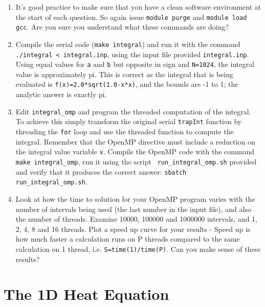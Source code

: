 \documentclass[a4paper, 12pt]{article}
\def \cc   {\tt }               %
\begin{document}
\begin{enumerate}

  \item It's good practice to make sure that you have a clean
    software environment at the start of each question. So
    again issue {\cc module purge} and
    {\cc module load gcc}. Are you sure you
    understand what these commands are doing?

  \item Compile the serial code ({\cc make integral}) and run it with
    the command {\cc ./integral < integral.inp}, using the input file
    provided {\cc integral.inp}.  Using equal values for {\cc a} and
    {\cc b} but opposite in sign and {\cc N=1024}, the integral value
    is approximately pi. This is correct as the integral that is being
    evaluated is {\cc f(x)=2.0*sqrt(1.0-x*x)}, and the bounds are -1 to 1;
    the analytic answer is exactly pi.

  \item Edit {\cc integral\_omp} and program the threaded computation
    of the integral.  To achieve this simply transform the original
    serial {\cc trapInt} function by threading the {\cc for} loop and
    use the threaded function to compute the integral.  Remember that
    the OpenMP directive must include a reduction on the integral
    value variable {\cc v}.  Compile the OpenMP code with the command
    {\cc make integral\_omp}, run it using the script {\cc
        run\_integral\_omp.sh} provided and verify that it produces the
    correct answer: {\cc sbatch run\_integral\_omp.sh}.

  \item Look at how the time to solution for your OpenMP program varies
    with the number of intervals being used (the last number in the input file),
    and also the number of threads. Examine 10000, 100000 and 1000000 intervals,
    and 1, 2, 4, 8 and 16 threads. Plot a speed up curve for your results -
    Speed up is how much faster a calculation runs on P threads compared to the same
    calculation on 1 thread, i.e. {\cc S=time(1)/time(P)}. Can you make sense of
    these results?

\end{enumerate}



\section{The 1D Heat Equation}
\label{heat}
\end{document}
